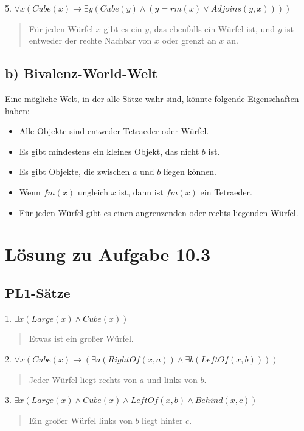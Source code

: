 \documentclass{article}
\begin{document}
5. \(\forall x (Cube(x) \rightarrow \exists y (Cube(y) \land (y = rm(x) \lor Adjoins(y, x))))\)
   \begin{quote}
   Für jeden Würfel \(x\) gibt es ein \(y\), das ebenfalls ein Würfel ist, und \(y\) ist entweder der rechte Nachbar von \(x\) oder grenzt an \(x\) an.
   \end{quote}

\subsection*{b) Bivalenz-World-Welt}

Eine mögliche Welt, in der alle Sätze wahr sind, könnte folgende Eigenschaften haben:
\begin{itemize}
    \item Alle Objekte sind entweder Tetraeder oder Würfel.
    \item Es gibt mindestens ein kleines Objekt, das nicht \(b\) ist.
    \item Es gibt Objekte, die zwischen \(a\) und \(b\) liegen können.
    \item Wenn \(fm(x)\) ungleich \(x\) ist, dann ist \(fm(x)\) ein Tetraeder.
    \item Für jeden Würfel gibt es einen angrenzenden oder rechts liegenden Würfel.
\end{itemize}

\section*{Lösung zu Aufgabe 10.3}

\subsection*{PL1-Sätze}

1. \(\exists x (Large(x) \land Cube(x))\)
   \begin{quote}
   Etwas ist ein großer Würfel.
   \end{quote}
   
2. \(\forall x (Cube(x) \rightarrow (\exists a (RightOf(x, a)) \land \exists b (LeftOf(x, b))))\)
   \begin{quote}
   Jeder Würfel liegt rechts von \(a\) und links von \(b\).
   \end{quote}

3. \(\exists x (Large(x) \land Cube(x) \land LeftOf(x, b) \land Behind(x, c))\)
   \begin{quote}
   Ein großer Würfel links von \(b\) liegt hinter \(c\).
   \end{quote}
\end{document}
